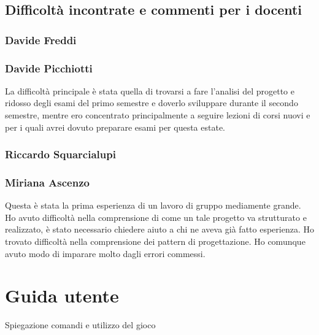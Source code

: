 \documentclass[a4paper,12pt]{report}
\begin{document}
    \section{Difficoltà incontrate e commenti per i docenti}

	\subsection{Davide Freddi}
	\subsection{Davide Picchiotti}
    La difficoltà principale è stata quella di trovarsi a fare l'analisi del progetto e ridosso degli esami del primo semestre e doverlo sviluppare
    durante il secondo semestre, mentre ero concentrato principalmente a seguire lezioni di corsi nuovi e per i quali avrei dovuto preparare esami per questa estate.

    \subsection{Riccardo Squarcialupi}
    \subsection{Miriana Ascenzo}
    Questa è stata la prima esperienza di un lavoro di gruppo mediamente grande.
    Ho avuto difficoltà nella comprensione di come un tale progetto va strutturato e realizzato, è stato necessario chiedere aiuto a chi ne aveva già fatto esperienza.
    Ho trovato difficoltà nella comprensione dei pattern di progettazione.
    Ho comunque avuto modo di imparare molto dagli errori commessi.







	\appendix
	\chapter{Guida utente}

	Spiegazione comandi e utilizzo del gioco
\end{document}
